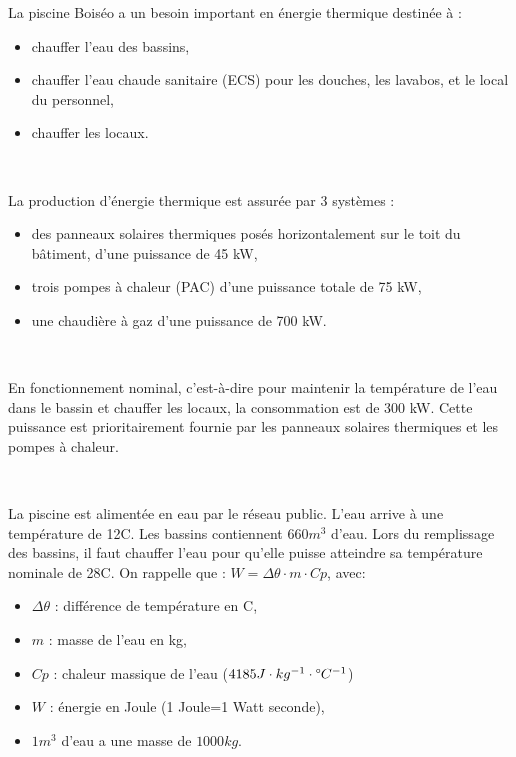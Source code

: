 La piscine Boiséo a un besoin important en énergie thermique destinée à :
\begin{itemize}
 \item chauffer l'eau des bassins,
 \item chauffer l'eau chaude sanitaire (ECS) pour les douches, les lavabos, et le local du personnel,
 \item chauffer les locaux.
\end{itemize}



~\

La production d'énergie thermique est assurée par 3 systèmes :
\begin{itemize}
 \item des panneaux solaires thermiques posés horizontalement sur le toit du bâtiment, d'une puissance de 45 kW,
 \item trois pompes à chaleur (PAC) d'une puissance totale de 75 kW,
 \item une chaudière à gaz d'une puissance de 700 kW.
\end{itemize}


~\

En fonctionnement nominal, c'est-à-dire pour maintenir la température de l'eau dans le bassin et chauffer les locaux, la consommation est de 300 kW. Cette puissance est prioritairement fournie par les panneaux solaires thermiques et les pompes à chaleur.


~\

La piscine est alimentée en eau par le réseau public. L'eau arrive à une température de 12\textdegree C. Les bassins contiennent $660m^3$ d'eau.
Lors du remplissage des bassins, il faut chauffer l'eau pour qu'elle puisse atteindre sa température nominale de 28\textdegree C.
On rappelle que : $W = \Delta\theta\cdot m\cdot Cp$, avec:
\begin{itemize}
 \item $\Delta\theta$ : différence de température en \textdegree C,
 \item $m$ : masse de l'eau en kg,
 \item $Cp$ : chaleur massique de l'eau ($4185J\cdot kg^{-1}\cdot\degree C^{-1}$)
 \item $W$ : énergie en Joule (1 Joule=1 Watt seconde),
 \item $1m^3$ d'eau a une masse de $1000 kg$.
\end{itemize}


